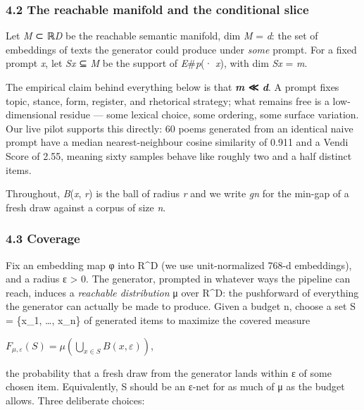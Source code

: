 \documentclass[
  10pt,
]{article}
\theoremstyle{plain}
\theoremstyle{definition}
\begin{document}
\subsubsection{4.2 The reachable manifold and the conditional
slice}\label{42-the-reachable-manifold-and-the-conditional-slice}

Let \emph{M} ⊂ ℝ\emph{D} be the reachable semantic manifold, dim
\emph{M} = \emph{d}: the set of embeddings of texts the generator could
produce under \emph{some} prompt. For a fixed prompt \emph{x}, let
\emph{Sx} ⊆ \emph{M} be the support of \emph{E}\#\emph{p}(· \textbar{}
\emph{x}), with dim \emph{Sx} = \emph{m}.

The empirical claim behind everything below is that \textbf{\emph{m} ≪
\emph{d}}. A prompt fixes topic, stance, form, register, and rhetorical
strategy; what remains free is a low-dimensional residue --- some
lexical choice, some ordering, some surface variation. Our live pilot
supports this directly: 60 poems generated from an identical naive
prompt have a median nearest-neighbour cosine similarity of 0.911 and a
Vendi Score of 2.55, meaning sixty samples behave like roughly two and a
half distinct items.

Throughout, \emph{B}(\emph{x}, \emph{r}) is the ball of radius \emph{r}
and we write \emph{gn} for the min-gap of a fresh draw against a corpus
of size \emph{n}.

\subsubsection{4.3 Coverage}\label{43-coverage}

Fix an embedding map φ into R\^{}D (we use unit-normalized 768-d
embeddings), and a radius ε \textgreater{} 0. The generator, prompted in
whatever ways the pipeline can reach, induces a \emph{reachable
distribution} μ over R\^{}D: the pushforward of everything the generator
can actually be made to produce. Given a budget n, choose a set S =
\{x\_1, \ldots, x\_n\} of generated items to maximize the covered
measure

\(F_{\mu,\varepsilon}(S) = \mu\!\left(\bigcup_{x \in S} B(x,\varepsilon)\right)\),

the probability that a fresh draw from the generator lands within ε of
some chosen item. Equivalently, S should be an ε-net for as much of μ as
the budget allows. Three deliberate choices:
\end{document}
